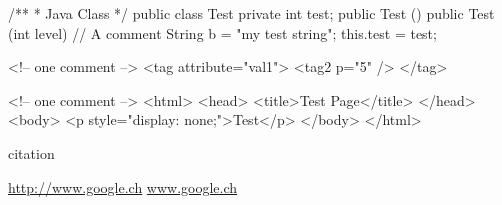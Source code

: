 \begin{javacode}
/**
 * Java Class
 */
public class Test {
	private int test;
	public Test () {}
	public Test (int level) {
		// A comment
		String b = "my test string";
		this.test = test;
	}
}
\end{javacode}

\begin{xmlcode}[caption={XML Code Example}, label=listing:xml:example]
<!-- one comment -->
<tag attribute="val1">
	<tag2 p="5" />
</tag>
\end{xmlcode}

\begin{htmlcode}
<!-- one comment -->
<html>
	<head>
		<title>Test Page</title>
	</head>
	<body>
		<p style="display: none;">Test</p>
	</body>
</html>
\end{htmlcode}

citation \cite{dummyarticle}

\url{http://www.google.ch}
\href{http://www.google.ch}{www.google.ch}

